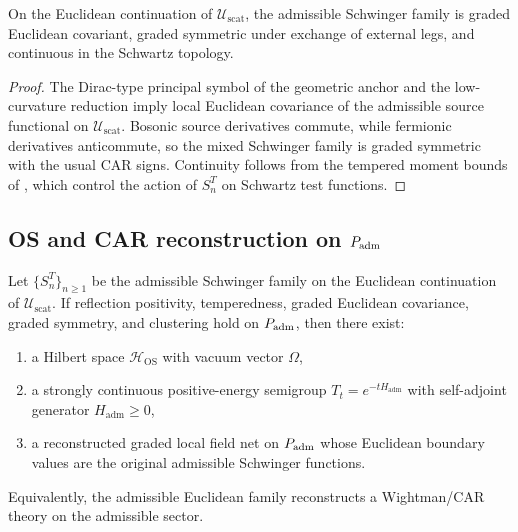 \begin{lemma}
\label{lem:graded-euclidean-covariance-padm}
On the Euclidean continuation of $\mathcal U_{\mathrm{scat}}$, the admissible Schwinger family is
graded Euclidean covariant, graded symmetric under exchange of external legs, and continuous in the
Schwartz topology.
\end{lemma}

\begin{proof}
The Dirac-type principal symbol of the geometric anchor and the low-curvature reduction imply local
Euclidean covariance of the admissible source functional on $\mathcal U_{\mathrm{scat}}$. Bosonic
source derivatives commute, while fermionic derivatives anticommute, so the mixed Schwinger family
is graded symmetric with the usual CAR signs. Continuity follows from the tempered moment bounds of
, which control the action of $S_n^T$ on Schwartz test
functions.
\end{proof}

\subsection{OS and CAR reconstruction on \texorpdfstring{$P_{\mathrm{adm}}$}{Padm}}

\begin{theorem}
\label{thm:tailored-os-car-reconstruction}
Let $\{S_n^T\}_{n\ge 1}$ be the admissible Schwinger family on the Euclidean continuation of
$\mathcal U_{\mathrm{scat}}$. If reflection positivity, temperedness, graded Euclidean covariance,
graded symmetry, and clustering hold on $P_{\mathrm{adm}}$, then there exist:
\begin{enumerate}[label=(\roman*), leftmargin=1.8em, topsep=3pt, itemsep=2pt]
    \item a Hilbert space $\mathcal H_{\mathrm{OS}}$ with vacuum vector $\Omega$,
    \item a strongly continuous positive-energy semigroup $T_t=e^{-tH_{\mathrm{adm}}}$ with
    self-adjoint generator $H_{\mathrm{adm}}\ge 0$,
    \item a reconstructed graded local field net on $P_{\mathrm{adm}}$ whose Euclidean boundary values are the
    original admissible Schwinger functions.
\end{enumerate}
Equivalently, the admissible Euclidean family reconstructs a Wightman/CAR theory on the admissible
sector.
\end{theorem}

